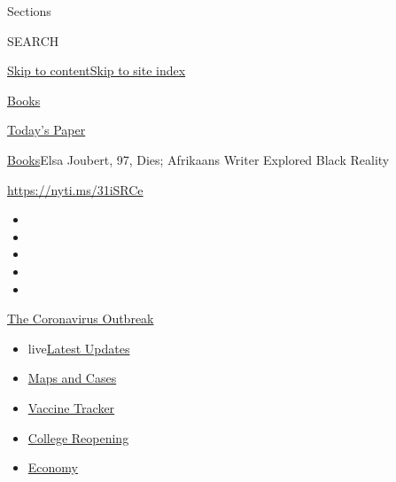 Sections

SEARCH

\protect\hyperlink{site-content}{Skip to
content}\protect\hyperlink{site-index}{Skip to site index}

\href{https://www.nytimes.com/section/books}{Books}

\href{https://myaccount.nytimes.com/auth/login?response_type=cookie\&client_id=vi}{}

\href{https://www.nytimes.com/section/todayspaper}{Today's Paper}

\href{/section/books}{Books}\textbar{}Elsa Joubert, 97, Dies; Afrikaans
Writer Explored Black Reality

\url{https://nyti.ms/31iSRCe}

\begin{itemize}
\item
\item
\item
\item
\item
\end{itemize}

\href{https://www.nytimes.com/news-event/coronavirus?action=click\&pgtype=Article\&state=default\&region=TOP_BANNER\&context=storylines_menu}{The
Coronavirus Outbreak}

\begin{itemize}
\tightlist
\item
  live\href{https://www.nytimes.com/2020/08/03/world/coronavirus-covid-19.html?action=click\&pgtype=Article\&state=default\&region=TOP_BANNER\&context=storylines_menu}{Latest
  Updates}
\item
  \href{https://www.nytimes.com/interactive/2020/us/coronavirus-us-cases.html?action=click\&pgtype=Article\&state=default\&region=TOP_BANNER\&context=storylines_menu}{Maps
  and Cases}
\item
  \href{https://www.nytimes.com/interactive/2020/science/coronavirus-vaccine-tracker.html?action=click\&pgtype=Article\&state=default\&region=TOP_BANNER\&context=storylines_menu}{Vaccine
  Tracker}
\item
  \href{https://www.nytimes.com/2020/08/02/us/covid-college-reopening.html?action=click\&pgtype=Article\&state=default\&region=TOP_BANNER\&context=storylines_menu}{College
  Reopening}
\item
  \href{https://www.nytimes.com/live/2020/08/03/business/stock-market-today-coronavirus?action=click\&pgtype=Article\&state=default\&region=TOP_BANNER\&context=storylines_menu}{Economy}
\end{itemize}

